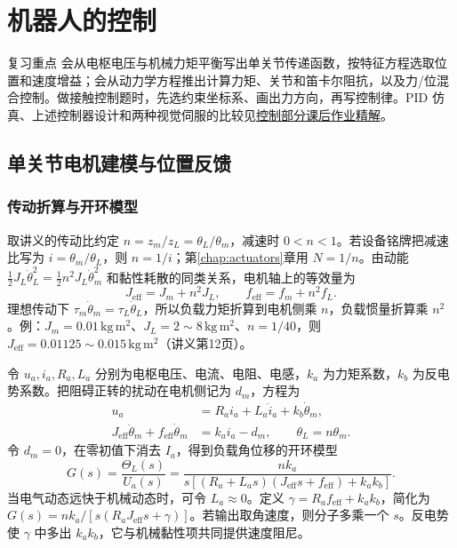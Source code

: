 \chapter{机器人的控制}
\label{ch:robot-control}

\begin{focusbox}{复习重点}
会从电枢电压与机械力矩平衡写出单关节传递函数，按特征方程选取位置和速度增益；会从动力学方程推出计算力矩、关节和笛卡尔阻抗，以及力/位混合控制。做接触控制题时，先选约束坐标系、画出力方向，再写控制律。PID 仿真、上述控制器设计和两种视觉伺服的比较见\hyperref[hw:robot-control]{控制部分课后作业精解}。
\end{focusbox}

\section{单关节电机建模与位置反馈}

\subsection{传动折算与开环模型}
取讲义的传动比约定 $n=z_m/z_L=\theta_L/\theta_m$，减速时 $0<n<1$。若设备铭牌把减速比写为 $i=\theta_m/\theta_L$，则 $n=1/i$；第\ref{chap:actuators}章用 $N=1/n$。由动能 $\tfrac12J_L\dot\theta_L^2=\tfrac12n^2J_L\dot\theta_m^2$ 和黏性耗散的同类关系，电机轴上的等效量为
\[
J_{\mathrm{eff}}=J_m+n^2J_L,\qquad f_{\mathrm{eff}}=f_m+n^2f_L.
\]
理想传动下 $\tau_m\dot\theta_m=\tau_L\dot\theta_L$，所以负载力矩折算到电机侧乘 $n$，负载惯量折算乘 $n^2$。例：$J_m=0.01\,\mathrm{kg\,m^2}$、$J_L=2\sim8\,\mathrm{kg\,m^2}$、$n=1/40$，则 $J_{\mathrm{eff}}=0.01125\sim0.015\,\mathrm{kg\,m^2}$（讲义第12页）。

令 $u_a,i_a,R_a,L_a$ 分别为电枢电压、电流、电阻、电感，$k_a$ 为力矩系数，$k_b$ 为反电势系数。把阻碍正转的扰动在电机侧记为 $d_m$，方程为
\[
\begin{aligned}
 u_a &= R_a i_a+L_a\dot i_a+k_b\dot\theta_m,\\
 J_{\mathrm{eff}}\ddot\theta_m+f_{\mathrm{eff}}\dot\theta_m &=k_ai_a-d_m,\qquad \theta_L=n\theta_m.
\end{aligned}
\]
令 $d_m=0$，在零初值下消去 $I_a$，得到负载角位移的开环模型
\[
G(s)=\frac{\Theta_L(s)}{U_a(s)}
 =\frac{n k_a}{s[(R_a+L_a s)(J_{\mathrm{eff}}s+f_{\mathrm{eff}})+k_a k_b]}.
\]
当电气动态远快于机械动态时，可令 $L_a\approx0$。定义 $\gamma=R_a f_{\mathrm{eff}}+k_a k_b$，简化为 $G(s)=n k_a/[s(R_a J_{\mathrm{eff}}s+\gamma)]$。若输出取角速度，则分子多乘一个 $s$。反电势使 $\gamma$ 中多出 $k_a k_b$，它与机械黏性项共同提供速度阻尼。

